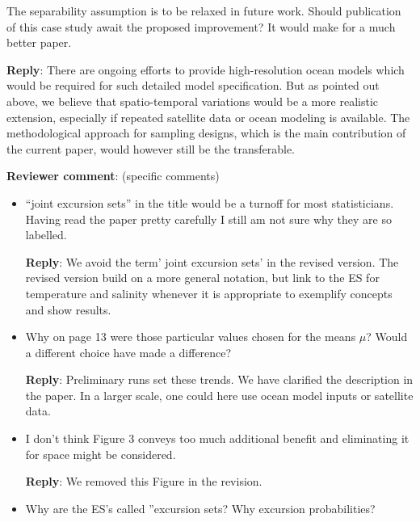 \documentclass[a4paper]{article}
\def\revcom{\textbf{Reviewer comment}}
\def\reply{\textbf{Reply}}
\begin{document}
\begin{answers}
The separability assumption is to be relaxed in future work. Should publication of this case study await the proposed improvement? It would make for a much better paper.

\reply: There are ongoing efforts to provide high-resolution ocean models which would be required for such detailed model specification. But as pointed out above, we believe that spatio-temporal variations would be a more realistic extension, especially if repeated satellite data or ocean modeling is available. The methodological approach for sampling designs, which is the main contribution of the current paper, would however still be the transferable.  

\item{\revcom : (specific comments)}\label{q11}


\begin{itemize}[noitemsep,topsep=0pt,parsep=0pt,partopsep=0pt]

\item “joint excursion sets” in the title would be a turnoff for most statisticians. Having read the paper pretty carefully I still am not sure why they are so labelled.\par
\reply: We avoid the term' joint excursion sets' in the revised version. The revised version build on a more general notation, but link to the ES for temperature and salinity whenever it is appropriate to exemplify concepts and show results.

\vspace{1em}

\item Why on page 13 were those particular values chosen for the means $\mu$? Would a different choice have made a difference?\par

\reply: Preliminary runs set these trends. We have clarified the description in the paper. In a larger scale, one could here use ocean model inputs or satellite data. 

\vspace{1em}

\item I don’t think Figure 3 conveys too much additional benefit and eliminating it for space might be considered.\par

\reply: We removed this Figure in the revision. 

\vspace{1em}

\item Why are the ES’s called ”excursion sets? Why excursion probabilities?\par


\end{itemize}
\end{answers}
\end{document}
